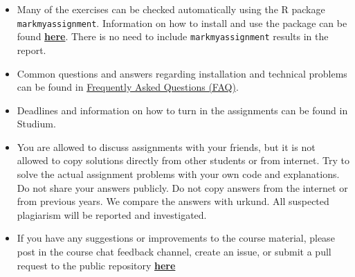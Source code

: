 \begin{itemize}
\begin{enumerate}
\end{enumerate}
\item Many of the exercises can be checked automatically using the R package \\ \texttt{markmyassignment}. Information on how to install and use the package can be found \href{https://cran.r-project.org/web/packages/markmyassignment/vignettes/markmyassignment.html}{\textbf{here}}. There is no need to include \texttt{markmyassignment} results in the report.
\item Common questions and answers regarding installation and technical problems can be found in \href{https://github.com/MansMeg/BSDA/blob/main/FAQ.md}{Frequently Asked Questions (FAQ)}.
\item Deadlines and information on how to turn in the assignments can be found in Studium.
\item You are allowed to discuss assignments with your friends, but it is not allowed to copy solutions directly from other students or from internet. Try to solve the actual assignment problems with your own code and explanations. Do not share your answers publicly. Do not copy answers from the internet or from previous years. We compare the answers with urkund. All suspected plagiarism will be reported and investigated.
\item If you have any suggestions or improvements to the course material, please post in the course chat feedback channel, create an issue, or submit a pull request to the public repository \href{https://github.com/MansMeg/BSDA/issues}{\textbf{here}}
\end{itemize}
